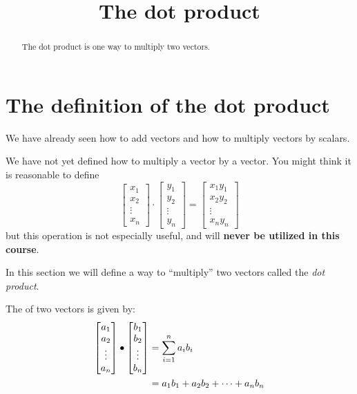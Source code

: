\documentclass{ximera}
\title[Dig-In:]{The dot product}
\begin{document}
\begin{abstract}
  The dot product is one way to multiply two vectors.
\end{abstract}
\maketitle


\section{The definition of the dot product}

We have already seen how to add vectors and how to multiply vectors by
scalars.

\begin{warning}
We have not yet defined how to multiply a vector by a vector.  You
might think it is reasonable to define
\[
\begin{bmatrix}x_1\\x_2\\\vdots\\x_n\end{bmatrix} \cdot  \begin{bmatrix}y_1\\y_2\\\vdots\\y_n\end{bmatrix}=\begin{bmatrix}x_1y_1\\x_2y_2\\\vdots\\x_ny_n\end{bmatrix}
\] 
but this operation is not especially useful, and will \textbf{never be
  utilized in this course}.
\end{warning}

In this section we will define a way to ``multiply'' two vectors
called the \textit{dot product}.

\begin{definition}
  The  of two vectors is given by:
  \begin{align*}
  \begin{bmatrix}
    a_1\\
    a_2\\
    \vdots\\
    a_n
  \end{bmatrix}
  \bullet
  \begin{bmatrix}
    b_1\\
    b_2\\
    \vdots\\
    b_n
  \end{bmatrix}
  &= \sum_{i=1}^n a_ib_i\\
  &= a_1b_1 + a_2b_2 +\dots+a_nb_n
  \end{align*}
\end{definition}
\end{document}
